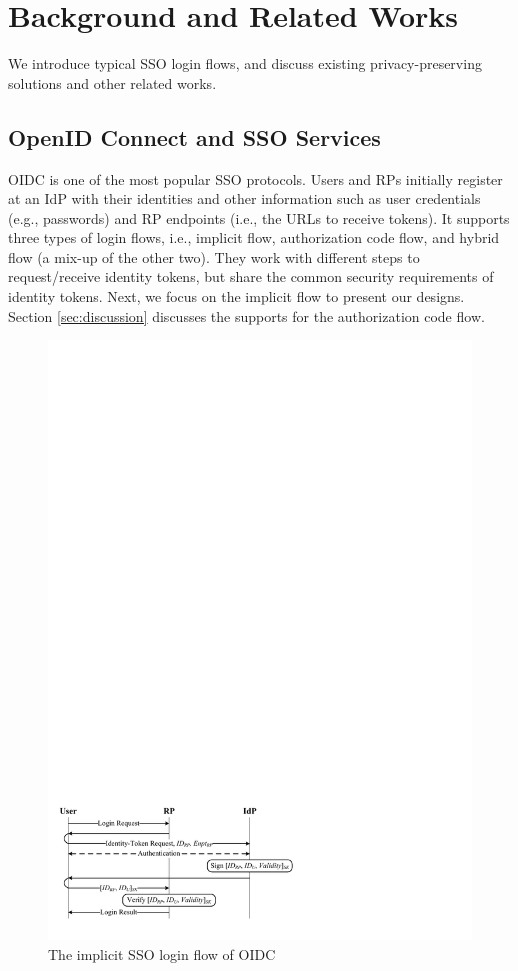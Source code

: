 \section{Background and Related Works}
\label{sec:background}

We introduce %
typical SSO login flows, and discuss existing privacy-preserving solutions and other related works.

\subsection{OpenID Connect and SSO Services}
\label{subsec:OIDC}
OIDC is one of the most popular SSO protocols.
Users and RPs initially register at an IdP with their identities
and other information such as user credentials (e.g., passwords)
and RP endpoints (i.e., the URLs to receive tokens).
It supports three types of login flows, i.e., implicit flow, authorization code flow,
 and hybrid flow (a mix-up of the other two).
They work with different steps to request/receive identity tokens, but share the common security requirements of identity tokens.
Next, we focus on the implicit flow to present our designs. Section \ref{sec:discussion} discusses the supports for the authorization code flow.

\begin{figure}[t]
  \centering
  \includegraphics[width=0.98\linewidth]{fig/OIDC1.pdf}
  \caption{The implicit SSO login flow of OIDC}
  \label{fig:OpenID}
\end{figure}

